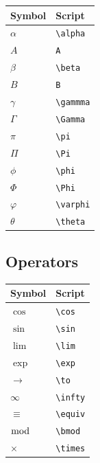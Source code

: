 \documentclass[
]{book}
\begin{document}
\begin{longtable}[]{@{}ll@{}}
\toprule\noalign{}
Symbol & Script \\
\midrule\noalign{}
\endhead
\bottomrule\noalign{}
\endlastfoot
\(\alpha\) & \texttt{\textbackslash{}alpha} \\
\(A\) & \texttt{A} \\
\(\beta\) & \texttt{\textbackslash{}beta} \\
\(B\) & \texttt{B} \\
\(\gamma\) & \texttt{\textbackslash{}gammma} \\
\(\Gamma\) & \texttt{\textbackslash{}Gamma} \\
\(\pi\) & \texttt{\textbackslash{}pi} \\
\(\Pi\) & \texttt{\textbackslash{}Pi} \\
\(\phi\) & \texttt{\textbackslash{}phi} \\
\(\Phi\) & \texttt{\textbackslash{}Phi} \\
\(\varphi\) & \texttt{\textbackslash{}varphi} \\
\(\theta\) & \texttt{\textbackslash{}theta} \\
\end{longtable}

\hypertarget{operators}{%
\subsection{Operators}\label{operators}}

\begin{longtable}[]{@{}ll@{}}
\toprule\noalign{}
Symbol & Script \\
\midrule\noalign{}
\endhead
\bottomrule\noalign{}
\endlastfoot
\(\cos\) & \texttt{\textbackslash{}cos} \\
\(\sin\) & \texttt{\textbackslash{}sin} \\
\(\lim\) & \texttt{\textbackslash{}lim} \\
\(\exp\) & \texttt{\textbackslash{}exp} \\
\(\to\) & \texttt{\textbackslash{}to} \\
\(\infty\) & \texttt{\textbackslash{}infty} \\
\(\equiv\) & \texttt{\textbackslash{}equiv} \\
\(\bmod\) & \texttt{\textbackslash{}bmod} \\
\(\times\) & \texttt{\textbackslash{}times} \\
\end{longtable}
\end{document}
